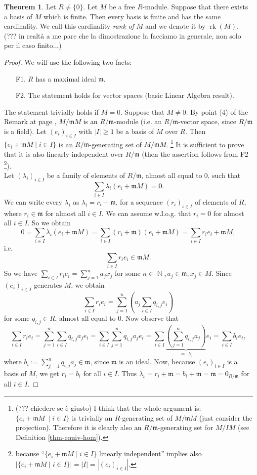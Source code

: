 \documentclass[12pt,a4paper]{report}
\theoremstyle{definition}
\newtheorem{theorem}{Theorem}[chapter] %
\theoremstyle{num.custom-title}
\DeclareMathOperator{\rk}{rk}
\DeclareMathOperator{\N}{\mathbb{N}}
\newcommand{\m}{\mathfrak{m}}
\begin{document}
\begin{theorem}
Let $R \neq \{0\}$. Let $M$ be a free $R$-module. Suppose that there exists a basis of $M$ which is finite. Then every basis is finite and has the same cardinality. We call this cardinality \emph{rank of} $M$ and we denote it by $\rk(M)$. (??? in realtà a me pare che la dimostrazione la facciamo in generale, non solo per il caso finito...)
\begin{proof}
We will use the following two facts:
\begin{enumerate}
\item[F1.] $R$ has a maximal ideal $\m$.
\item[F2.] The statement holds for vector spaces (basic Linear Algebra result).
\end{enumerate}
The statement trivially holds if $M=0$. Suppose that $M \neq 0$. By point (4) of the Remark at page \pageref{fac-mod_fac-ring}, $M/\m M$ is an $R/\m$-module (i.e. an $R/\m$-vector space, since $R/\m$ is a field). Let $(e_i)_{i \in I}$ with $|I| \geq 1$ be a basis of $M$ over $R$. Then $\{e_i + \m M \mid i \in I\}$ is an $R/\m$-generating set of $M/\m M$. \footnote{(??? chiedere se è giusto) I think that the whole argument is: $\{e_i + \m M\ \mid i \in I\}$ is trivially an $R$-generating set of $M/\m M$ (just consider the projection). Therefore it is clearly also an $R/\m$-generating set for $M/IM$ (see Definition \ref{thm-equiv-hom}).} It is sufficient to prove that it is also linearly independent over $R/\m$ (then the assertion follows from F2 \footnote{because ``$\{e_i + \m M \mid i \in I\}$ linearly independent'' implies also $|\{e_i + \m M \mid i \in I\}|=|I|=|(e_i)_{i \in I}|$.}).\\
Let $(\lambda_i)_{i \in I}$ be a family of elements of $R/\m$, almost all equal to $0$, such that
\[
\sum_{i \in I} \lambda_i (e_i + \m M) = 0.
\]
We can write every $\lambda_i$ as $\lambda_i = r_i + \m$, for a sequence $(r_i)_{i \in I}$ of elements of $R$, where $r_i \in \m$ for almost all $i \in I$. We can assume w.l.o.g. that $r_i = 0$ for almost all $i \in I$. So we obtain
\[
0 = \sum_{i \in I} \lambda_i (e_i + \m M) = \sum_{i \in I} (r_i + \m) (e_i + \m M) = \sum_{i \in I} r_i e_i + \m M,
\]
i.e.
\[
\sum_{i \in I} r_i e_i \in \m M.
\]
So we have $\sum_{i \in I} r_i e_i = \sum_{j=1}^n a_j x_j$ for some $n \in \N, a_j \in \m, x_j \in M$. Since $(e_i)_{i \in I}$ generates $M$, we obtain
\[
\sum_{i \in I} r_i e_i = \sum_{j=1}^n \left( a_j \sum_{i \in I} q_{i,j} e_i \right)
\]
for some $q_{i,j} \in R$, almost all equal to $0$. Now observe that
\[
\sum_{i \in I} r_i e_i = \sum_{j=1}^n \sum_{i \in I} q_{i,j} a_j e_i = \sum_{i \in I} \sum_{j=1}^n q_{i,j} a_j e_i = \sum_{i \in I} \underbrace{\left( \sum_{j=1}^n q_{i,j} a_j \right)}_{=: b_i} e_i = \sum_{i \in I} b_i e_i,
\]
where $b_i := \sum_{j=1}^n q_{i,j} a_j \in \m$, since $\m$ is an ideal.
Now, because $(e_i)_{i \in I}$ is a basis of $M$, we get $r_i = b_i$ for all $i \in I$. Thus $\lambda_i = r_i + \m = b_i + \m = \m = 0_{R/\m}$ for all $i \in I$.
\end{proof}
\end{theorem}
\end{document}
